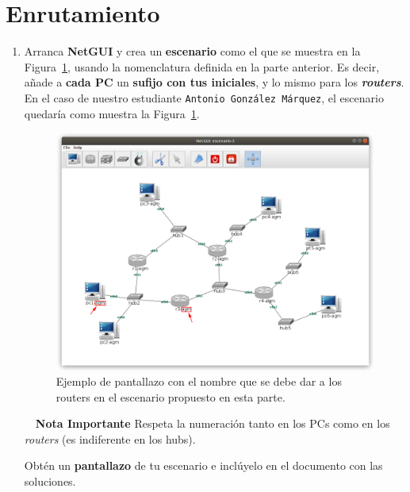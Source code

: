 \documentclass[a4paper]{article}
\begin{document}

\section{Enrutamiento}
\label{sec:routing}

\begin{enumerate}
	\item Arranca \textbf{NetGUI} y crea un \textbf{escenario} como el que se muestra en 
	la Figura~\ref{fig:router1}, usando la nomenclatura  definida en la parte anterior. Es decir, añade a \textbf{cada PC} un \textbf{sufijo con tus iniciales}, y lo mismo para los \textbf{\textit{routers}}.  En el caso de nuestro estudiante \texttt{Antonio González Márquez}, el escenario quedaría como muestra la Figura~\ref{fig:router1}.
					
	\begin{figure}
		\begin{center}
			\includegraphics[width=13cm]{ruter-01.png}
		\end{center}
		\caption{Ejemplo de pantallazo con el nombre que se debe dar a los routers en el escenario
		propuesto en esta parte.}
		\label{fig:router1}
	\end{figure}

	\begin{myredbox}{\faExclamationCircle~~\textbf{Nota Importante}}
		Respeta la numeración tanto en los PCs como en los \textit{routers} (es indiferente 
		en los hubs).
	\end{myredbox}
	\smallskip 

    Obtén un \textbf{pantallazo} de tu escenario e inclúyelo en el documento con las
    soluciones.
    

\end{enumerate}
\end{document}

